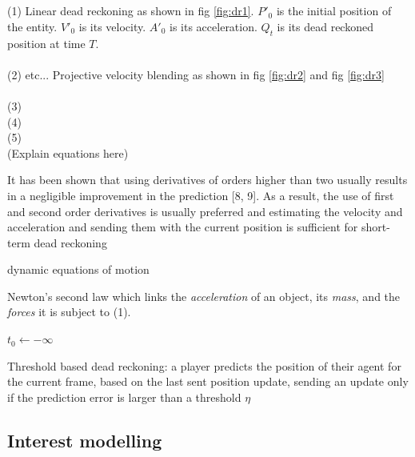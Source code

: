 \documentclass[journal]{IEEEtran}
\begin{document}
\cite{murphy2011believable} \\ \\
(1) Linear dead reckoning as shown in fig \ref{fig:dr1}. $P'_0$ is the initial position of the entity. $V'_0$ is its velocity. $A'_0$ is its acceleration. $Q_t$ is its dead reckoned position at time $T$.  \\ \\
(2) etc... Projective velocity blending as shown in fig \ref{fig:dr2} and fig \ref{fig:dr3} \\ \\
(3) \\
(4) \\
(5) \\

(Explain equations here)

It has been shown that using derivatives of orders higher than two usually results in a negligible improvement in the prediction [8, 9]. As a result, the use of first and second order derivatives is usually preferred and estimating the velocity and acceleration and sending them with the current position is sufficient for short-term dead reckoning \cite{yahyavi2011antreckoning}

dynamic equations of motion

Newton's second law which links the \textit{acceleration} of an object, its \textit{mass}, and the \textit{forces} it is subject to (1).

\begin{algorithm}
\DontPrintSemicolon %
$t_0 \gets -\infty$\;
\caption{Threshold based dead reckoning: a player predicts the position of their agent for the current frame, based on the last sent position update, sending an update only if the prediction error is larger than a threshold $\eta$}
\label{algo:pseudo}
\end{algorithm}

\subsection{Interest modelling}
\end{document}
